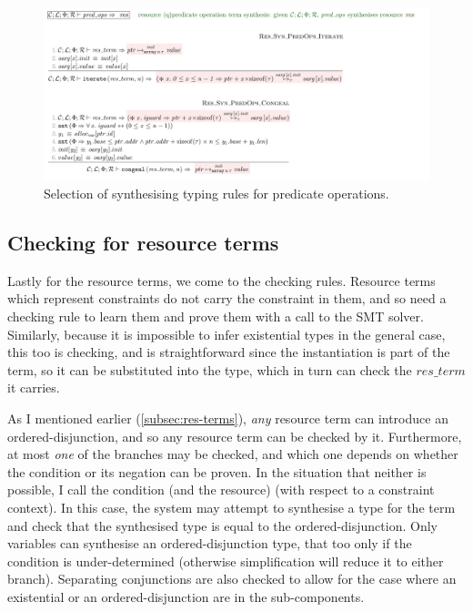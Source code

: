 \begin{figure}[tp]
    \includegraphics{figures/kernel-predops-typing}
    \caption{Selection of  synthesising typing rules for
        predicate operations.}\label{fig:typing-predops}
\end{figure}

\subsection{Checking for resource terms}\label{subsec:checking-res-terms}

Lastly for the resource terms, we come to the checking rules. Resource terms
which represent constraints do not carry the constraint in them, and so need a
checking rule to learn them and prove them with a call to the SMT solver.
Similarly, because it is impossible to infer existential types in the general
case, this too
is checking, and is straightforward since the instantiation is part of the
term, so it can be substituted into the type, which in turn can check the
$\mathit{res\_term}$ it carries.

As I mentioned earlier (\cref{subsec:res-terms}), \emph{any} resource term can
introduce an ordered-disjunction, and so any resource term can be checked by
it. Furthermore, at most \emph{one} of the branches may be checked, and which
one depends on whether the condition or its negation can be proven. In the
situation that neither is possible, I call the condition (and the resource)
 (with respect to a constraint context). In this case,
the system may attempt to synthesise a type for the term and check that the
synthesised type is equal to the ordered-disjunction. Only variables can
synthesise an ordered-disjunction type, that too only if the condition is
under-determined (otherwise simplification will reduce it to either branch).
Separating conjunctions are also checked to allow for the case where an
existential or an ordered-disjunction are in the sub-components.

